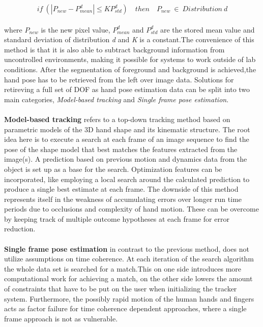 \begin{equation}
 if\ (|P_{new} −P^{d}_{mean}|\leq KP^{d}_{std})\quad then \quad P_{new}\  \in\ Distribution\ d
\end{equation}
\\where $P_{new}$ is the new pixel value, $P^{d}_{mean}$ and $P^{d}_{std}$ are the stored mean value and standard deviation of distribution \textit{d} and \textit{K} is a constant.The convenience of this method is that it is also able to subtract background information from uncontrolled environments, making it possible for systems to work outside of lab conditions.
After the segmentation of foreground and background is achieved,the hand pose has to be retrieved from the left over image data. Solutions for retireving a full set of DOF as hand pose estimation data can be split into two main categories\cite{Erol.2007}, \textit{Model-based tracking} and \textit{Single frame pose estimation}.\\\\
\textbf{Model-based tracking} refers to a top-down tracking method based on parametric models of the 3D hand shape and its kinematic structure. The root idea here is to execute a search at each frame of an image sequence to find the pose of the shape model that best matches the features extracted from the image(s). A prediction based on previous motion and dynamics data from the object is set up as a base for the search. Optimization features can be incorporated, like employing a local search around the calculated prediction to produce a single best estimate at each frame. The downside of this method represents itself in the weakness of accumulating errors over longer run time periods due to occlusions and complexity of hand motion. These can be overcome by keeping track of multiple outcome hypotheses at each frame for error reduction.
\\\\
\textbf{Single frame pose estimation} in contrast to the previous method, does not utilize assumptions on time coherence. At each iteration of the search algorithm the whole data set is searched for a match.This on one side introduces more computational work for achieving a match, on the other side lowers the amount of constraints that have to be put on the user when initializing the tracker system. Furthermore, the possibly rapid motion of the human hands and fingers acts as factor failure for time coherence dependent approaches, where a single frame approach is not as vulnerable.
